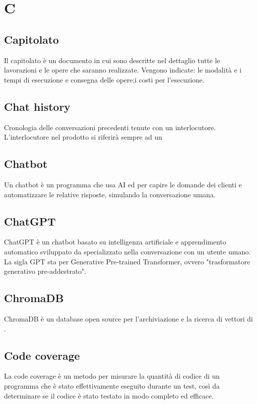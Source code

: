 \chapter{C}

\section{Capitolato}\label{sec:Capitolati}
Il capitolato è un documento in cui sono descritte nel dettaglio tutte le lavorazioni e le opere che saranno realizzate. Vengono indicate: le modalità e i tempi di esecuzione e consegna delle opere;i costi per l'esecuzione.

\section{Chat history}
Cronologia delle conversazioni precedenti tenute con un interlocutore. L'interlocutore nel prodotto si riferirà sempre ad un 

\section{Chatbot}
Un chatbot è un programma che usa AI ed  per capire le domande dei clienti e automatizzare le relative risposte, simulando la conversazione umana.

\section{ChatGPT}
ChatGPT è un chatbot basato su intelligenza artificiale e apprendimento automatico sviluppato da  specializzato nella conversazione con un utente umano. La sigla GPT sta per Generative Pre-trained Transformer, ovvero "trasformatore generativo pre-addestrato". 

\section{ChromaDB}\label{sec:Chroma}
ChromaDB è un database open source per l'archiviazione e la ricerca di vettori di .

\section{Code coverage}
La code coverage è un metodo per misurare la quantità di codice di un programma che è stato effettivamente eseguito durante un test, così da determinare se il codice è stato testato in modo completo ed efficace.

